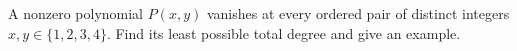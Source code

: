 A nonzero polynomial $P(x,y)$ vanishes at every ordered pair of distinct integers $x,y\in\{1,2,3,4\}$. Find its least possible total degree and give an example.
